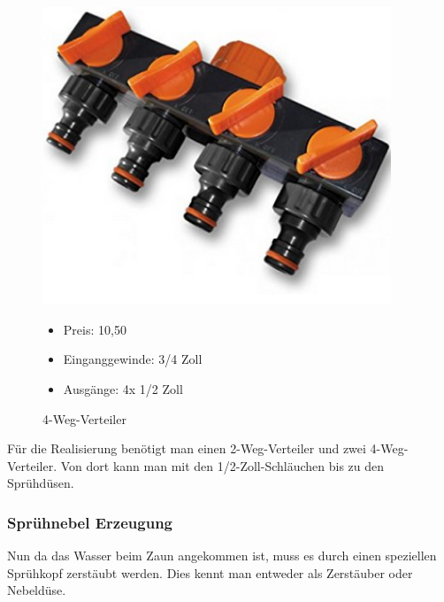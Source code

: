 \begin{figure}[H]
\begin{minipage}[t]{0.45\textwidth}
\includegraphics[width=0.93\textwidth]{fig/Gardena4Weg}
\caption{4-Weg-Verteiler}

\begin{itemize}
	\item{Preis: 10,50\textsf{\texteuro}}
	\item{Einganggewinde: 3/4 Zoll}
	\item{Ausgänge: 4x 1/2 Zoll}
\end{itemize}
\end{minipage}
\end{figure}

Für die Realisierung benötigt man einen 2-Weg-Verteiler und zwei 4-Weg-Verteiler. Von dort kann man mit den 1/2-Zoll-Schläuchen bis zu den Sprühdüsen.

\subsubsection{Sprühnebel Erzeugung}
\label{sec:spruehnebel}


Nun da das Wasser beim Zaun angekommen ist, muss es durch einen speziellen Sprühkopf zerstäubt werden. Dies kennt man entweder als Zerstäuber oder Nebeldüse. 

